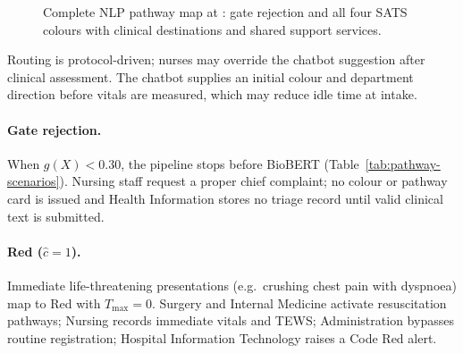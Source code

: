 \begin{figure}[H]
{}
\caption{Complete NLP pathway map at \examplehospital{}: gate rejection and all four SATS colours with clinical destinations and shared support services.}
\label{fig:pathway-map}
\end{figure}

\begin{remark}
Routing is protocol-driven; nurses may override the chatbot suggestion after clinical assessment. The chatbot supplies an initial colour and department direction before vitals are measured, which may reduce idle time at intake.
\end{remark}

\paragraph{Gate rejection.}
When \(g(X) < 0.30\), the pipeline stops before BioBERT (Table~\ref{tab:pathway-scenarios}). Nursing staff request a proper chief complaint; no colour or pathway card is issued and Health Information stores no triage record until valid clinical text is submitted.

\paragraph{Red (\(\hat{c}=1\)).}
Immediate life-threatening presentations (e.g.\ crushing chest pain with dyspnoea) map to Red with \(T_{\max}=0\). Surgery and Internal Medicine activate resuscitation pathways; Nursing records immediate vitals and TEWS; Administration bypasses routine registration; Hospital Information Technology raises a Code Red alert.

